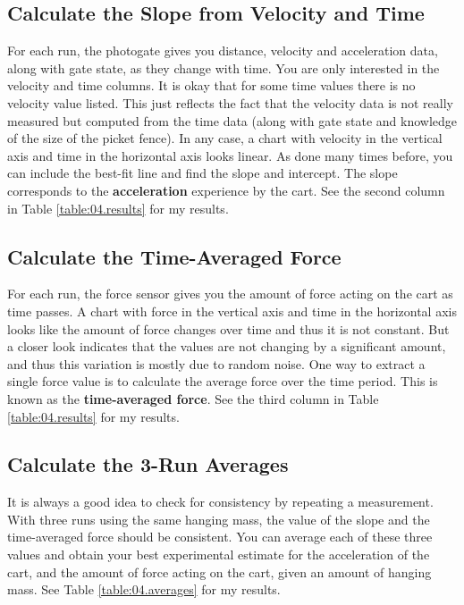 \subsection{Calculate the Slope from Velocity and Time}
%
For each run, the photogate gives you distance, velocity and acceleration data, along with gate state, as they change with time. You are only interested in the velocity and time columns. It is okay that for some time values there is no velocity value listed. This just reflects the fact that the velocity data is not really measured but computed from the time data (along with gate state and knowledge of the size of the picket fence). In any case, a chart with velocity in the vertical axis and time in the horizontal axis looks linear. As done many times before, you can include the best-fit line and find the slope and intercept. The slope corresponds to the \textbf{acceleration} experience by the cart. See the second column in Table \ref{table:04.results} for my results.
%
\subsection{Calculate the Time-Averaged Force}
%
For each run, the force sensor gives you the amount of force acting on the cart as time passes. A chart with force in the vertical axis and time in the horizontal axis looks like the amount of force changes over time and thus it is not constant. But a closer look indicates that the values are not changing by a significant amount, and thus this variation is mostly due to random noise. One way to extract a single force value is to calculate the average force over the time period. This is known as the \textbf{time-averaged force}. See the third column in Table \ref{table:04.results} for my results.
%
\subsection{Calculate the 3-Run Averages}
%
It is always a good idea to check for consistency by repeating a measurement. With three runs using the same hanging mass, the value of the slope and the time-averaged force should be consistent. You can average each of these three values and obtain your best experimental estimate for the acceleration of the cart, and the amount of force acting on the cart, given an amount of hanging mass. See Table \ref{table:04.averages} for my results.
%
